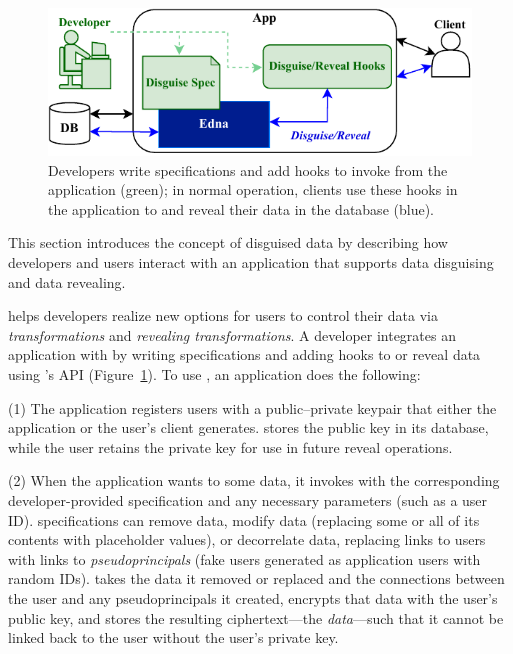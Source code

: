 \begin{figure}[t]
  \centering
    \includegraphics[width=.7\textwidth]{figs/edna_overview}
    \caption[Developers write disguise specifications and add hooks to invoke
    Edna's API.]{Developers write \xx specifications and add hooks to invoke
    \sys from the application (green); in normal operation, clients use these
    hooks in the application to \xx and reveal their data in the database
    (blue).}
  \label{f:edna-overview}
\end{figure}
%

This section introduces the concept of disguised data by describing how
developers and users interact with an application that supports data disguising
and data revealing.
%

%
\sys helps developers realize new options for users to control their data
via \emph{\xxing transformations} and \emph{revealing transformations}.
%
A developer integrates an application with \sys by writing \xx specifications
and adding hooks to \xx or reveal data using \sys's API
(Figure~\ref{f:edna-overview}). To use \sys, an application does the following:

%
(1) The application registers users with a public--private keypair
that either the application or the user's client generates. \sys stores the
public key in its database, while the user retains the private key for use in
future reveal operations.
%

%
(2) When the application wants to \xx some data, it invokes \sys with the
corresponding developer-provided \xx specification and any necessary
parameters (such as a user ID).
%
\Xx specifications can remove data, modify data (replacing some or all of its
contents with placeholder values), or decorrelate data, replacing
links to users with links to \emph{pseudoprincipals} (fake users generated as
application users with random IDs).
%
%
\sys takes the data it removed or replaced and the connections between the user
and any pseudoprincipals it created, encrypts that data with the user's public
key, and stores the resulting ciphertext---the \emph{\xxed data}---such that it
cannot be linked back to the user without the user's
private key.
%


